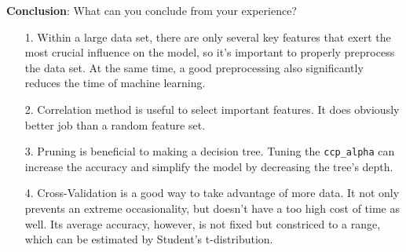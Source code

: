 \documentclass{article}
\begin{document}
        
        
        \textbf{Conclusion}: What can you conclude from your experience?\\
        \begin{itemize}
        	\item[1.]Within a large data set, there are only several key features that exert the most crucial influence on the model, so it's important to properly preprocess the data set. At the same time, a good preprocessing also significantly reduces the time of machine learning.
        	\item[2.]Correlation method is useful to select important features. It does obviously better job than a random feature set.
        	\item[3.]Pruning is beneficial to making a decision tree. Tuning the \texttt{ccp\_alpha} can increase the accuracy and simplify the model by decreasing the tree's depth.
        	\item[4.]Cross-Validation is a good way to take advantage of more data. It not only prevents an extreme occasionality, but doesn't have a too high cost of time as well. Its average accuracy, however, is not fixed but constriced to a range, which can be estimated by Student's t-distribution.
        \end{itemize}
        
\end{document}
